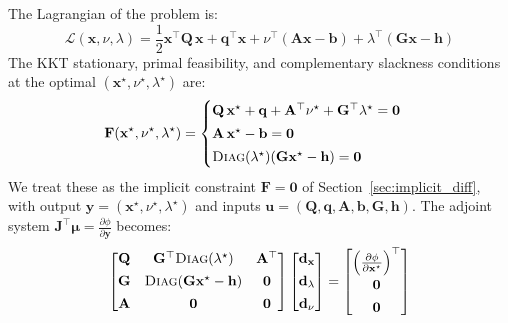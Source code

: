 \documentclass{article}
\newcommand{\pdc}[2]{\frac{\partial #1}{\partial #2}}
\begin{document}
\noindent The Lagrangian of the problem is:
\begin{equation*}
\mathcal{L}(\mathbf{x}, \nu, \lambda) = 
    \frac{1}{2}\mathbf{x}^\top \mathbf{Q}\,\mathbf{x} + \mathbf{q}^\top \mathbf{x} +
    \nu^\top(\mathbf{A}\mathbf{x}-\mathbf{b}) +
    \lambda^\top(\mathbf{G}\mathbf{x} - \mathbf{h})
\end{equation*}
The KKT stationary, primal feasibility, and complementary slackness conditions at the optimal $(\mathbf{x}^\star, \nu^\star, \lambda^\star)$ are:
\begin{equation*}
\mathbf{F}(\mathbf{x}^\star, \nu^\star, \lambda^\star) = \begin{cases}
    \mathbf{Q}\,\mathbf{x}^\star + \mathbf{q} + \mathbf{A}^\top \nu^\star + \mathbf{G}^\top \lambda^\star = \mathbf{0} \\[0.5ex]
    \mathbf{A}\,\mathbf{x}^\star - \mathbf{b} = \mathbf{0} \\[0.5ex]
    \textsc{Diag}(\lambda^\star)(\mathbf{G}\mathbf{x}^\star-\mathbf{h}) = \mathbf{0}
\end{cases}
\end{equation*}
We treat these as the implicit constraint $\mathbf{F} = \mathbf{0}$ of Section~\ref{sec:implicit_diff}, with output $\mathbf{y} = (\mathbf{x}^\star, \nu^\star, \lambda^\star)$ and inputs $\mathbf{u} = (\mathbf{Q}, \mathbf{q}, \mathbf{A}, \mathbf{b}, \mathbf{G}, \mathbf{h})$. The adjoint system $\mathbf{J}^\top \boldsymbol{\mu} = \pdc{\phi}{\mathbf{y}}$ becomes:
\begin{equation}
\label{eq:optnet_adjoint}
\begin{bmatrix}
    \mathbf{Q} & \mathbf{G}^\top\textsc{Diag}(\lambda^\star) & \mathbf{A}^\top \\[1ex]
    \mathbf{G} & \textsc{Diag}(\mathbf{G}\mathbf{x}^\star - \mathbf{h}) & \mathbf{0} \\[1ex]
    \mathbf{A} & \mathbf{0} & \mathbf{0}
\end{bmatrix}
\begin{bmatrix}
    \mathbf{d}_\mathbf{x} \\[1ex] \mathbf{d}_{\lambda} \\[1ex] \mathbf{d}_{\nu}
\end{bmatrix}
=
\begin{bmatrix}
    \left(\pdc{\phi}{\mathbf{x}^\star}\right)^\top \\[1ex] \mathbf{0} \\[1ex] \mathbf{0}
\end{bmatrix}
\end{equation}
\end{document}
